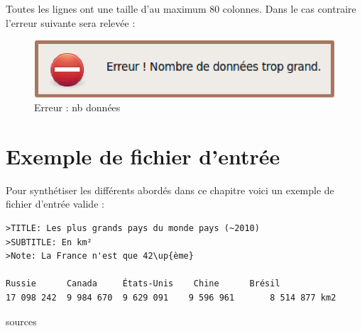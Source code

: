 Toutes les lignes ont une taille d’au maximum 80 colonnes. Dans le cas contraire l'erreur suivante sera relevée : 
\begin{figure}[htbp]
  \centering
  \includegraphics[scale=0.40]{img/enbdonnes}
  \caption{Erreur : nb données}
  \label{fig:enbdonees}
\end{figure}



\section{Exemple de fichier d'entrée}
Pour synthétiser les différents abordés dans ce chapitre voici un exemple de fichier d'entrée valide : 
\begin{verbatim}
>TITLE: Les plus grands pays du monde pays (~2010)
>SUBTITLE: En km²
>Note: La France n'est que 42\up{ème}

Russie      Canada 	   États-Unis    Chine 	    Brésil 
17 098 242  9 984 670  9 629 091  	9 596 961  		8 514 877 km2 	
\end{verbatim}
sources \cite{wiki}
